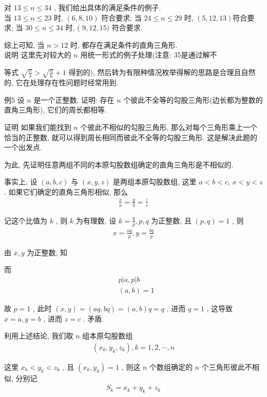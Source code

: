 对 $13 \leqslant n \leqslant 34$ , 我们给出具体的满足条件的例子. \\
当 $13 \leqslant n \leqslant 23$ 时,  $(6,8,10)$ 符合要求; 当 $24 \leqslant n \leqslant 29$ 时,  $(5,12,13)$符合要求; 当 $30 \leqslant n \leqslant 34$ 时, ( $9,12,15)$ 符合要求.

综上可知, 当 $n>12$ 时, 都存在满足条件的直角三角形.\\
说明 这里先对较大的 $n$ 用统一形式的例子处理(注意: 35是通过解不

等式 $\sqrt{\frac{n}{3}}>\sqrt{\frac{n}{6}}+1$ 得到的), 然后转为有限种情况枚举得解的思路是合理且自然的, 它在处理存在性问题时经常用到.

例5 设 $n$ 是一个正整数. 证明: 存在 $n$ 个彼此不全等的勾股三角形(边长都为整数的直角三角形), 它们的周长都相等.

证明 如果我们能找到 $n$ 个彼此不相似的勾股三角形, 那么对每个三角形乘上一个恰当的正整数, 就可以得到周长相同而彼此不全等的勾股三角形. 这是解决此题的一个出发点.

为此, 先证明任意两组不同的本原勾股数组确定的直角三角形是不相似的.

事实上, 设 $(a, b, c)$ 与 $(x, y, z)$ 是两组本原勾股数组, 这里 $a<b<c$, $x<y<z$ . 如果它们确定的直角三角形相似, 那么
\begin{align*}
	\frac{x}{a}=\frac{y}{b}=\frac{z}{c}
\end{align*}

记这个比值为 $k$ , 则 $k$ 为有理数. 设 $k=\frac{q}{p}, p ,  q$ 为正整数, 且 $(p, q)=1$ , 则
\begin{align*}
	x=\frac{a q}{p}, y=\frac{b q}{p}
\end{align*}

由 $x ,  y$ 为正整数, 知

而\begin{align}
	 & p|a, p| b \\
	 & (a, b)=1
\end{align}

故 $p=1$ , 此时 $(x, y)=(a q, b q)=(a, b) q=q$ . 进而 $q=1$ , 这导致 $x=a, y=b$ , 进而 $z=c$ . 矛盾.

利用上述结论, 我们取 $n$ 组本原勾股数组
\begin{align*}
	\left(x_{k}, y_{k}, z_{k}\right), k=1,2, \cdots, n
\end{align*}

这里 $x_{k}<y_{k}<z_{k}$ , 且 $\left(x_{k}, y_{k}\right)=1$ , 则这 $n$ 个数组确定的 $n$ 个三角形彼此不相似, 分别记
\begin{align*}
	S_{k}=x_{k}+y_{k}+z_{k}
\end{align*}

